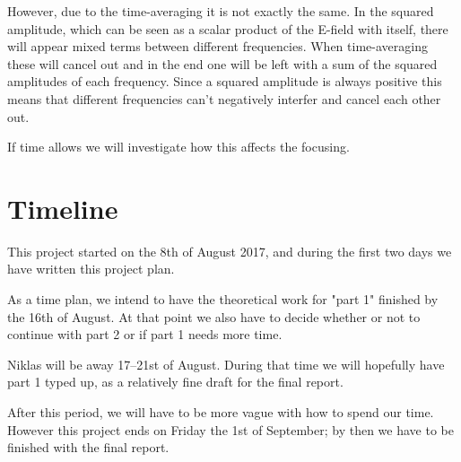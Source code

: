 \documentclass[11pt,a4paper, 
english, swedish %
]{article}
\begin{document}
However, due to the time-averaging it is not exactly the same. In the squared amplitude, which can be seen as a scalar product of the E-field with itself, there will appear mixed terms between different frequencies. When time-averaging these will cancel out and in the end one will be left with a sum of the squared amplitudes of each frequency. Since a squared amplitude is always positive this means that different frequencies can't negatively interfer and cancel each other out.

If time allows we will investigate how this affects the focusing. 







\section{Timeline}
This project started on the 8th of August 2017, and during the first two days we have written this project plan.

As a time plan, we intend to have the theoretical work for "part 1" finished by the 16th of August. At that point we also have to decide whether or not to continue with part 2 or if part 1 needs more time.

Niklas will be away 17--21st of August. During that time we will hopefully have part 1 typed up, as a relatively fine draft for the final report.

After this period, we will have to be more vague with how to spend our time. However this project ends on Friday the 1st of September; by then we have to be finished with the final report.










%

\end{document}
